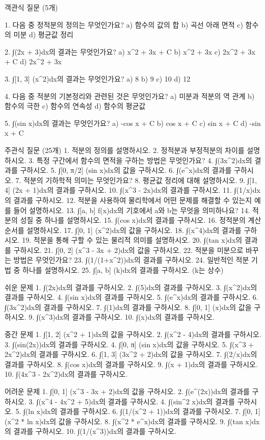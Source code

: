 \documentclass[fleqn]{article}
\begin{document}
      
         객관식 질문 (5개)

1. 다음 중 정적분의 정의는 무엇인가요?
   a) 함수의 값의 합  
   b) 곡선 아래 면적  
   c) 함수의 미분  
   d) 평균값 정리

2. ∫(2x + 3)dx의 결과는 무엇인가요?
   a) x^2 + 3x + C  
   b) x^2 + 3x  
   c) 2x^2 + 3x + C  
   d) 2x^2 + 3x

3. ∫[1, 3] (x^2)dx의 결과는 무엇인가요?
   a) 8  
   b) 9  
   c) 10  
   d) 12

4. 다음 중 적분의 기본정리와 관련된 것은 무엇인가요?
   a) 미분과 적분의 역 관계  
   b) 함수의 극한  
   c) 함수의 연속성  
   d) 함수의 평균값

5. ∫(sin x)dx의 결과는 무엇인가요?
   a) -cos x + C  
   b) cos x + C  
   c) sin x + C  
   d) -sin x + C

 주관식 질문 (25개)
1. 적분의 정의를 설명하시오.
2. 정적분과 부정적분의 차이를 설명하시오.
3. 특정 구간에서 함수의 면적을 구하는 방법은 무엇인가요?
4. ∫(3x^2)dx의 결과를 구하시오.
5. ∫[0, π/2] (sin x)dx의 값을 구하시오.
6. ∫(e^x)dx의 결과를 구하시오.
7. 적분의 기하학적 의미는 무엇인가요?
8. 평균값 정리에 대해 설명하시오.
9. ∫[1, 4] (2x + 1)dx의 결과를 구하시오.
10. ∫(x^3 - 2x)dx의 결과를 구하시오.
11. ∫(1/x)dx의 결과를 구하시오.
12. 적분을 사용하여 물리학에서 어떤 문제를 해결할 수 있는지 예를 들어 설명하시오.
13. ∫[a, b] f(x)dx의 기호에서 a와 b는 무엇을 의미하나요?
14. 적분의 성질 중 하나를 설명하시오.
15. ∫(cos x)dx의 결과를 구하시오.
16. 정적분의 계산 순서를 설명하시오.
17. ∫[0, 1] (x^2)dx의 값을 구하시오.
18. ∫(x^4)dx의 결과를 구하시오.
19. 적분을 통해 구할 수 있는 물리적 의미를 설명하시오.
20. ∫(tan x)dx의 결과를 구하시오.
21. ∫[0, 2] (x^3 - 3x + 2)dx의 값을 구하시오.
22. 적분을 미분으로 바꾸는 방법은 무엇인가요?
23. ∫(1/(1+x^2))dx의 결과를 구하시오.
24. 일반적인 적분 기법 중 하나를 설명하시오.
25. ∫[a, b] (k)dx의 결과를 구하시오. (k는 상수)

 쉬운 문제
1. ∫(2x)dx의 결과를 구하시오.  
2. ∫(5)dx의 결과를 구하시오.  
3. ∫(x^2)dx의 결과를 구하시오.  
4. ∫(sin x)dx의 결과를 구하시오.  
5. ∫(e^x)dx의 결과를 구하시오.  
6. ∫(3x^2)dx의 결과를 구하시오.  
7. ∫(1)dx의 결과를 구하시오.  
8. ∫[0, 1] (x)dx의 값을 구하시오.  
9. ∫(x^3)dx의 결과를 구하시오.  
10. ∫(x)dx의 결과를 구하시오.  

 중간 문제
1. ∫[1, 2] (x^2 + 1)dx의 값을 구하시오.  
2. ∫(x^2 - 4)dx의 결과를 구하시오.  
3. ∫(sin(2x))dx의 결과를 구하시오.  
4. ∫[0, π] (sin x)dx의 값을 구하시오.  
5. ∫(x^3 + 2x^2)dx의 결과를 구하시오.  
6. ∫[1, 3] (3x^2 + 2)dx의 값을 구하시오.  
7. ∫(2/x)dx의 결과를 구하시오.  
8. ∫(cos x)dx의 결과를 구하시오.  
9. ∫(x + 1)dx의 결과를 구하시오.  
10. ∫(4x^3 - 2x^2)dx의 결과를 구하시오.  

 어려운 문제
1. ∫[0, 1] (x^3 - 3x + 2)dx의 값을 구하시오.  
2. ∫(e^(2x))dx의 결과를 구하시오.  
3. ∫(x^4 - 4x^2 + 5)dx의 결과를 구하시오.  
4. ∫(sin^2 x)dx의 결과를 구하시오.  
5. ∫(ln x)dx의 결과를 구하시오.  
6. ∫(1/(x^2 + 1))dx의 결과를 구하시오.  
7. ∫[0, 1] (x^2 * ln x)dx의 값을 구하시오.  
8. ∫(x^2 * e^x)dx의 결과를 구하시오.  
9. ∫(tan x)dx의 결과를 구하시오.  
10. ∫(1/(x^3))dx의 결과를 구하시오.  

      
        
\end{document}
